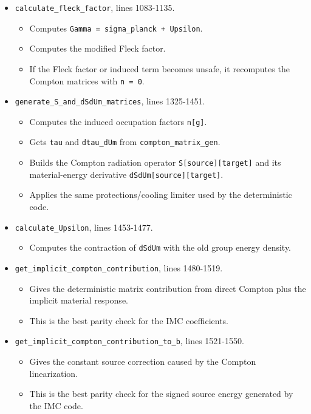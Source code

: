 \documentclass[
]{article}
\providecommand{\tightlist}{%
  \setlength{\itemsep}{0pt}\setlength{\parskip}{0pt}}
\begin{document}
\begin{itemize}
\tightlist
\item
  \texttt{calculate\_fleck\_factor}, lines 1083-1135.

  \begin{itemize}
  \tightlist
  \item
    Computes \texttt{Gamma\ =\ sigma\_planck\ +\ Upsilon}.
  \item
    Computes the modified Fleck factor.
  \item
    If the Fleck factor or induced term becomes unsafe, it recomputes
    the Compton matrices with \texttt{n\ =\ 0}.
  \end{itemize}
\item
  \texttt{generate\_S\_and\_dSdUm\_matrices}, lines 1325-1451.

  \begin{itemize}
  \tightlist
  \item
    Computes the induced occupation factors \texttt{n{[}g{]}}.
  \item
    Gets \texttt{tau} and \texttt{dtau\_dUm} from
    \texttt{compton\_matrix\_gen}.
  \item
    Builds the Compton radiation operator
    \texttt{S{[}source{]}{[}target{]}} and its material-energy
    derivative \texttt{dSdUm{[}source{]}{[}target{]}}.
  \item
    Applies the same protections/cooling limiter used by the
    deterministic code.
  \end{itemize}
\item
  \texttt{calculate\_Upsilon}, lines 1453-1477.

  \begin{itemize}
  \tightlist
  \item
    Computes the contraction of \texttt{dSdUm} with the old group energy
    density.
  \end{itemize}
\item
  \texttt{get\_implicit\_compton\_contribution}, lines 1480-1519.

  \begin{itemize}
  \tightlist
  \item
    Gives the deterministic matrix contribution from direct Compton plus
    the implicit material response.
  \item
    This is the best parity check for the IMC coefficients.
  \end{itemize}
\item
  \texttt{get\_implicit\_compton\_contribution\_to\_b}, lines 1521-1550.

  \begin{itemize}
  \tightlist
  \item
    Gives the constant source correction caused by the Compton
    linearization.
  \item
    This is the best parity check for the signed source energy generated
    by the IMC code.
  \end{itemize}
\end{itemize}
\end{document}
